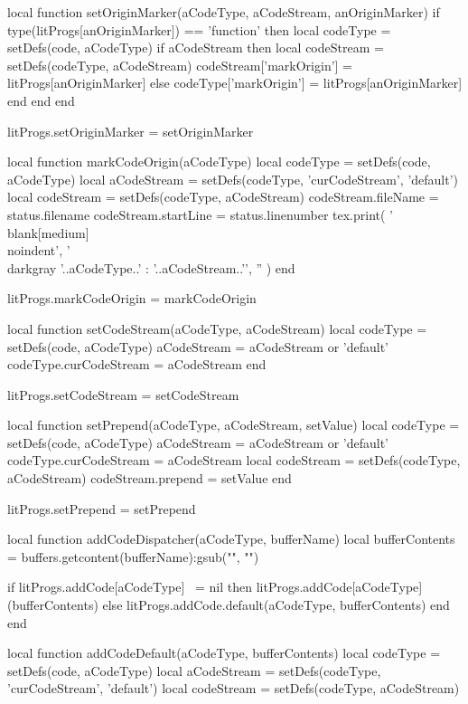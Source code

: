 \startLuaCode
local function setOriginMarker(aCodeType, aCodeStream, anOriginMarker)
  if type(litProgs[anOriginMarker]) == 'function' then
    local codeType  = setDefs(code, aCodeType)
    if aCodeStream then
      local codeStream = setDefs(codeType, aCodeStream)
      codeStream['markOrigin'] = litProgs[anOriginMarker]
    else
      codeType['markOrigin'] = litProgs[anOriginMarker]
    end
  end
end

litProgs.setOriginMarker = setOriginMarker

local function markCodeOrigin(aCodeType)
  local codeType         = setDefs(code, aCodeType)
  local aCodeStream      = setDefs(codeType, 'curCodeStream', 'default')
  local codeStream       = setDefs(codeType, aCodeStream)
  codeStream.fileName    = status.filename
  codeStream.startLine   = status.linenumber
  tex.print({
   '\\blank[medium]\\noindent',
   '{\\darkgray '..aCodeType..' : '..aCodeStream..'}',
   ''
   })
end

litProgs.markCodeOrigin = markCodeOrigin

local function setCodeStream(aCodeType, aCodeStream)
  local codeType         = setDefs(code, aCodeType)
  aCodeStream            = aCodeStream or 'default'
  codeType.curCodeStream = aCodeStream
end

litProgs.setCodeStream = setCodeStream

local function setPrepend(aCodeType, aCodeStream, setValue)
  local codeType         = setDefs(code, aCodeType)
  aCodeStream            = aCodeStream or 'default'
  codeType.curCodeStream = aCodeStream
  local codeStream       = setDefs(codeType, aCodeStream)
  codeStream.prepend     = setValue
end

litProgs.setPrepend = setPrepend

local function addCodeDispatcher(aCodeType, bufferName)
  local bufferContents  =
    buffers.getcontent(bufferName):gsub("", "\n")

  if litProgs.addCode[aCodeType] ~= nil then
    litProgs.addCode[aCodeType](bufferContents)
  else
    litProgs.addCode.default(aCodeType, bufferContents)
  end
end

local function addCodeDefault(aCodeType, bufferContents)
  local codeType        = setDefs(code, aCodeType)
  local aCodeStream     = setDefs(codeType, 'curCodeStream', 'default')
  local codeStream      = setDefs(codeType, aCodeStream)

